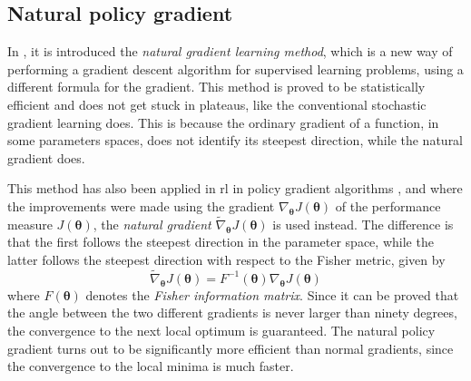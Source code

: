 \subsection{Natural policy gradient}
\label{sec:npg}

In \cite{Amari1998}, it is introduced the \emph{natural gradient learning method}, which is a new way of performing a gradient descent algorithm for supervised learning problems, using a different formula for the gradient. This method is proved to be statistically efficient and does not get stuck in plateaus, like the conventional stochastic gradient learning does. This is because the ordinary gradient of a function, in some parameters spaces, does not identify its steepest direction, while the natural gradient does.

This method has also been applied in \acrshort{rl} in policy gradient algorithms \cite{Peters2008}, and where the improvements were made using the gradient $\nabla_{\boldsymbol \theta} J(\boldsymbol \theta)$ of the performance measure $J(\boldsymbol \theta)$, the \emph{natural gradient} $\widetilde \nabla_{\boldsymbol \theta} J(\boldsymbol \theta)$ is used instead. The difference is that the first follows the steepest direction in the parameter space, while the latter follows the steepest direction with respect to the Fisher metric, given by
\begin{equation}
    \widetilde \nabla_{\boldsymbol \theta} J(\boldsymbol \theta) = F^{-1}(\boldsymbol \theta) \nabla_{\boldsymbol \theta} J(\boldsymbol \theta)
    \label{eq:natgradJ}
\end{equation}
where $F(\boldsymbol \theta)$ denotes the \emph{Fisher information matrix}. Since it can be proved that the angle between the two different gradients is never larger than ninety degrees, the convergence to the next local optimum is guaranteed. The natural policy gradient turns out to be significantly more efficient than normal gradients, since the convergence to the local minima is much faster.

